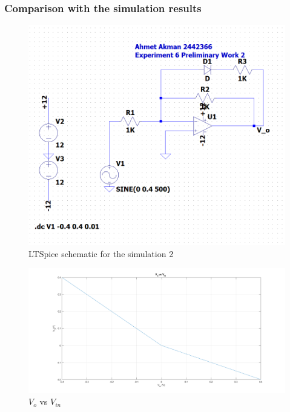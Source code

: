 \documentclass[letterpaper,12pt]{article}
\begin{document}
\subsubsection{Comparison with the simulation results}
\begin{figure}[H]
	\centering
   \includegraphics[width=1\textwidth]{Pre2.png}
   \caption{LTSpice schematic for the simulation 2 }
\end{figure}

\begin{figure}[H]
	\centering
   \includegraphics[width=1\textwidth]{Pre_2.png}
   \caption{\(V_{o}\) vs \(V_{in}\)}
\end{figure}
\end{document}

